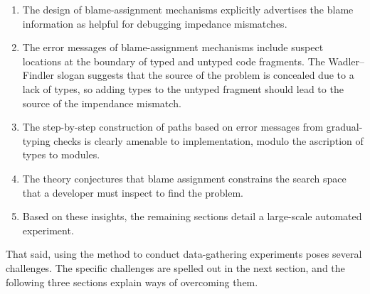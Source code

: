 \begin{enumerate}

\item The design of blame-assignment mechanisms explicitly advertises the blame
information as helpful for debugging impedance mismatches.

\item The error messages of blame-assignment mechanisms include suspect
locations at the boundary of typed and untyped code fragments.
The Wadler--Findler slogan suggests that the source of the problem is concealed due to a lack of types, so
adding types to the untyped fragment should lead to the source of the impendance mismatch.

\item The step-by-step construction of paths based on error messages from
gradual-typing checks is clearly amenable to implementation, modulo the
ascription of types to modules.

\item The theory conjectures that blame assignment constrains the search
space that a developer must inspect to find the problem.

\item Based on these insights, the remaining sections detail a large-scale automated experiment.

\end{enumerate}
That said, using the method to conduct data-gathering experiments poses
several challenges. The specific challenges are spelled out in the next section,
and the following three sections explain ways of overcoming them.
